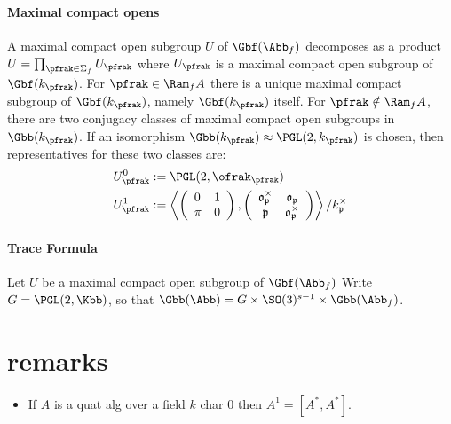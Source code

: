 \documentclass{article}
\begin{document}
\paragraph*{Maximal compact opens}
A maximal compact open subgroup $U$ of $\Gbf(\Abb_f)$ decomposes as a product $U = \prod_{\pfrak \in \Sigma_f} U_\pfrak$ where $U_\pfrak$ is a maximal compact open subgroup of $\Gbf(k_\pfrak)$. For $\pfrak \in \Ram_f A$ there is a unique maximal compact subgroup of $\Gbf(k_\pfrak)$, namely $\Gbf(k_\pfrak)$ itself. For $\pfrak \notin \Ram_f A$, there are two conjugacy classes of maximal compact open subgroups in $\Gbb(k_\pfrak)$. If an isomorphism $\Gbb(k_\pfrak) \approx \PGL(2,k_\pfrak)$ is chosen, then representatives for these two classes are:
\begin{align*}
    U_\pfrak^0 & := \PGL(2,\ofrak_\pfrak)                                                                                                  \\
    U_\pfrak^1 & := \left\langle\left(\begin{array}{ll}
                                              0   & 1 \\
                                              \pi & 0
                                          \end{array}\right),\left(\begin{array}{cc}
                                                                       \mathfrak{o}_{\mathfrak{p}}^{\times} & \mathfrak{o}_{\mathfrak{p}}          \\
                                                                       \mathfrak{p}                         & \mathfrak{o}_{\mathfrak{p}}^{\times}
                                                                   \end{array}\right)\right\rangle / k_{\mathfrak{p}}^{\times}
\end{align*}




\paragraph*{Trace Formula}
Let $U$ be a maximal compact open subgroup of $\Gbf(\Abb_f)$
Write $G = \PGL(2,\Kbb)$, so that $\Gbb(\Abb) = G \times \SO(3)^{s-1}\times \Gbb(\Abb_f)$.

\section*{remarks}
\begin{itemize}
    \item If $A$ is a quat alg over a field $k$ char $0$ then  $A^1= [A^*,A^*]$.
\end{itemize}
\end{document}
